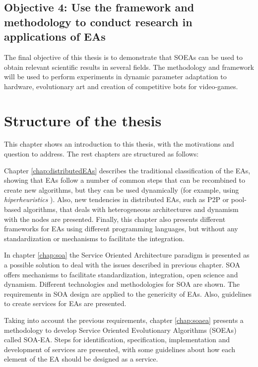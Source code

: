 \subsection*{Objective 4: Use the framework and methodology to conduct research in applications of EAs}
\label{subsec:intro:obj:applications}
The final objective of this thesis is to demonstrate that SOEAs can be used to obtain relevant scientific results in several fields. The methodology and framework will be used to perform experiments in dynamic parameter adaptation to hardware, evolutionary art and creation of competitive bots for video-games.



\section{Structure of the thesis}
\label{sec:intro:structure}

This chapter shows an introduction to this thesis, with the motivations and question to address. The rest chapters are structured as follows:

Chapter \ref{chap:distributedEAs} describes the traditional classification of the EAs, showing that EAs follow a number of common steps that can be recombined to create new algorithms, but they can be used dynamically (for example, using {\em hiperheuristics} \cite{cowling2001hyperheuristic}). Also, new tendencies in distributed EAs, such as P2P or pool-based algorithms, that deals with heterogeneous architectures and dynamism with the nodes are presented. Finally, this chapter also presents different frameworks for EAs using different programming languages, but without any standardization or mechanisms to facilitate the integration.

In chapter \ref{chap:soa} the Service Oriented Architecture paradigm is presented as a possible solution to deal with the issues described in previous chapter. SOA  offers mechanisms to facilitate standardization, integration, open science and dynamism. Different technologies and methodologies for SOA are shown. The requirements in SOA design are applied to the genericity of EAs. Also, guidelines to create services for EAs are presented.

Taking into account the previous requirements, chapter \ref{chap:soaea} presents a methodology to develop Service Oriented Evolutionary Algorithms (SOEAs) called SOA-EA. Steps for identification, specification, implementation and development of services are presented, with some guidelines about how each element of the EA should be designed as a service.

